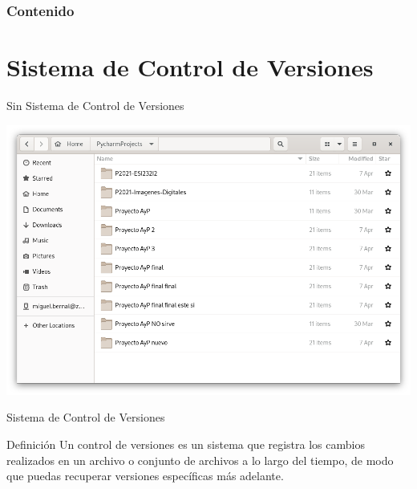\begin{frame}
    \frametitle{Contenido}
    \tableofcontents
\end{frame}

\section{Sistema de Control de Versiones}

\begin{frame}[c]{Sin Sistema de Control de Versiones}
    \begin{center}
        \includegraphics[scale=0.3]{img/proyectos-carpetas.png}
    \end{center}
\end{frame}

\begin{frame}[c]{Sistema de Control de Versiones}
    \begin{block}{Definición}
        Un control de versiones es un sistema que registra los cambios
        realizados en un archivo o conjunto de archivos a lo largo del
        tiempo, de modo que puedas recuperar versiones específicas más
        adelante.
    \end{block}

\end{frame}

